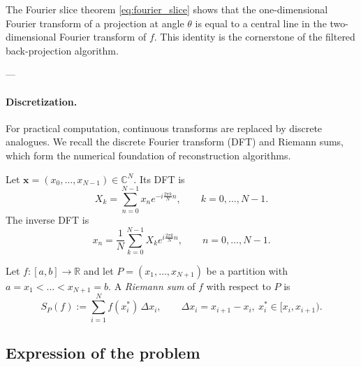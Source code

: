 \documentclass[12pt,a4paper]{article}
\begin{document}
The Fourier slice theorem \eqref{eq:fourier_slice} shows that the one-dimensional Fourier transform of a projection at angle $\theta$ is equal to a central line in the two-dimensional Fourier transform of $f$. This identity is the cornerstone of the filtered back-projection algorithm.

---

\paragraph{Discretization.}
For practical computation, continuous transforms are replaced by discrete analogues. We recall the discrete Fourier transform (DFT) and Riemann sums, which form the numerical foundation of reconstruction algorithms.

\begin{definition}
\label{def:DFT}
Let $\mathbf{x} = (x_0,\dots,x_{N-1}) \in \mathbb{C}^N$. Its DFT is
\begin{equation}
X_k = \sum_{n=0}^{N-1} x_n e^{-i \tfrac{2\pi k}{N}n}, \qquad k=0,\dots,N-1.
\label{eq:dft}
\end{equation}
The inverse DFT is
\begin{equation}
x_n = \frac{1}{N}\sum_{k=0}^{N-1} X_k e^{i \tfrac{2\pi k}{N}n}, \qquad n=0,\dots,N-1.
\label{eq:idft}
\end{equation}
\end{definition}

\begin{definition}
Let $f:[a,b]\to \mathbb{R}$ and let $P=(x_1,\dots,x_{N+1})$ be a partition with $a=x_1<\dots<x_{N+1}=b$. A \emph{Riemann sum} of $f$ with respect to $P$ is
\begin{equation}
S_P(f) := \sum_{i=1}^N f(x_i^*)\,\Delta x_i,
\qquad \Delta x_i = x_{i+1}-x_i,\ x_i^*\in[x_i,x_{i+1}).
\label{eq:riemann}
\end{equation}
\end{definition}

\subsection{Expression of the problem}
\label{problem_expr}
\end{document}
